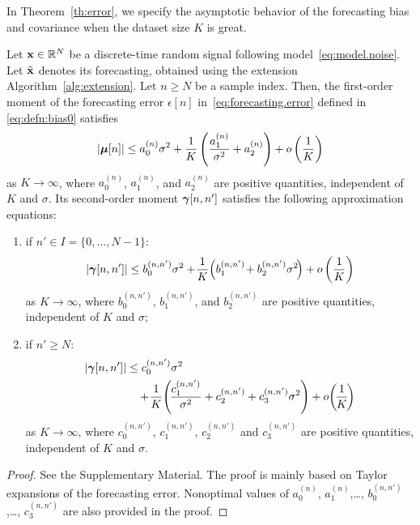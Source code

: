 In Theorem~\ref{th:error}, we specify the asymptotic behavior of the forecasting bias and covariance when the dataset size $K$ is great.
\begin{theorem}
\label{th:error}
Let ${\mathbf x}\in{\mathbb R}^N$ be a discrete-time random signal following model~\eqref{eq:model.noise}. Let $\tilde{{\mathbf x}}$ denotes its forecasting, obtained using the extension Algorithm~\ref{alg:extension}. Let $n\geq N$ be a sample index. Then, the first-order moment of the forecasting error $\epsilon[n]$ in~\eqref{eq:forecasting.error} defined in \eqref{eq:defn:bias0} satisfies
\begin{equation}
\left|\bmu[n]\right| \leq a^{(n)}_0\sigma^2 + \dfrac1K \left( \dfrac{a^{(n)}_1}{\sigma^2} + a^{(n)}_2 \right) + o\left( \dfrac1K \right)
\label{eq:mean.error}
\end{equation}
as $K\to\infty$, where $a^{(n)}_0$, $a^{(n)}_1$, and $a^{(n)}_2$ are positive quantities, independent of $K$ and $\sigma$.
Its second-order moment $\boldsymbol{\gamma}[n,n']$ satisfies the following approximation equations:
\begin{enumerate}[label=(\roman*)]
\item if $n'\in I=\{0,\ldots,N-1\}$:
\begin{equation}
\left|\bgamma[n,n']\right|\leq b^{(n,n')}_0\sigma^2 + \!\dfrac1K\! \left( b^{(n,n')}_1\! + b^{(n,n')}_2\sigma^2 \! \right) + o\left( \dfrac1K \right)
\label{eq:cov.error.1}
\end{equation}
as $K\to\infty$, where $b^{(n,n')}_0$, $b^{(n,n')}_1$, and $b^{(n,n')}_2$ are positive quantities, independent of $K$ and $\sigma$;
\item if $n'\geq N$:
\begin{align}
\nonumber
\left|\bgamma[n,n']\right| &\leq c^{(n,n')}_0\sigma^2 \\
&\hspace{10pt} + \!\dfrac1K\! \left(\! \dfrac{c^{(n,n')}_1}{\sigma^2} + c^{(n,n')}_2 + c^{(n,n')}_3\sigma^2 \right) + o\!\left( \!\dfrac1K \!\right)
\label{eq:cov.error.2}
\end{align}
as $K\to\infty$, where $c^{(n,n')}_0$, $c^{(n,n')}_1$, $c^{(n,n')}_2$ and $c^{(n,n')}_3$ are positive quantities, independent of $K$ and $\sigma$.
\end{enumerate}
\end{theorem}

\begin{proof}
See the Supplementary Material. The proof is mainly based on Taylor expansions of the forecasting error. Nonoptimal values of $a^{(n)}_0$, $a^{(n)}_1$,\dots, $b^{(n,n')}_0$,\dots, $c^{(n,n')}_3$ are also provided in the proof. 
\end{proof}

